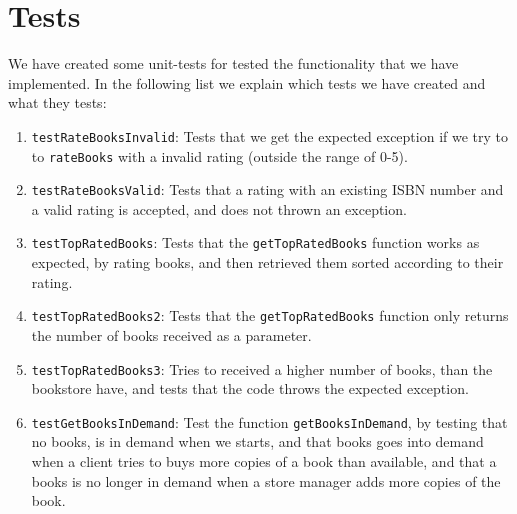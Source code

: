 \documentclass[10pt,a4paper]{article}
\begin{document}
\section*{Tests}
We have created some unit-tests for tested the functionality that we have implemented. In the following list we explain which tests we have created and what they tests:
\begin{enumerate}
\item \texttt{testRateBooksInvalid}: Tests that we get the expected exception if we try to to \texttt{rateBooks} with a invalid rating (outside the range of 0-5).
\item \texttt{testRateBooksValid}: Tests that a rating with an existing ISBN number and a valid rating is accepted, and does not thrown an exception.
\item \texttt{testTopRatedBooks}: Tests that the \texttt{getTopRatedBooks} function works as expected, by rating books, and then retrieved them sorted according to their rating. 
\item \texttt{testTopRatedBooks2}: Tests that the \texttt{getTopRatedBooks} function only returns the number of books received as a parameter. 
\item \texttt{testTopRatedBooks3}: Tries to received a higher number of books, than the bookstore have, and tests that the code throws the expected exception. 
\item \texttt{testGetBooksInDemand}: Test the function \texttt{getBooksInDemand}, by testing that no books, is in demand when we starts, and that books goes into demand when a client tries to buys more copies of a book than available, and that a books is no longer in demand when a store manager adds more copies of the book.
\end{enumerate}
\end{document}
